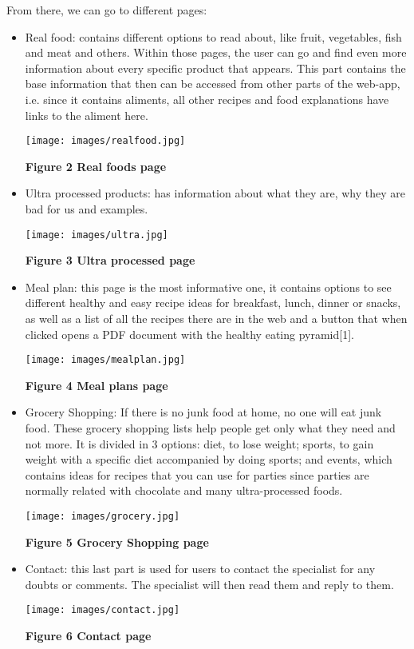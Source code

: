 \documentclass[10pt, a4paper]{article}
\begin{document}
    From there, we can go to different pages:
    \begin{itemize}
        \item Real food: contains different options to read about, like fruit, vegetables, fish and meat and others. Within those pages, the user can go and find even more information about every specific product that appears. This part contains the base information that then can be accessed from other parts of the web-app, i.e. since it contains aliments, all other recipes and food explanations have links to the aliment here.

        \texttt{[image: images/realfood.jpg]}

        \textbf{Figure 2 Real foods page}
        \vspace{2mm}

        \item Ultra processed products: has information about what they are, why they are bad for us and examples.

        \texttt{[image: images/ultra.jpg]}

        \textbf{Figure 3 Ultra processed page}
        \vspace{2mm}

        \item Meal plan: this page is the most informative one, it contains options to see different healthy and easy recipe ideas for breakfast, lunch, dinner or snacks, as well as a list of all the recipes there are in the web and a button that when clicked opens a PDF document with the healthy eating pyramid[1].

        \texttt{[image: images/mealplan.jpg]}

        \textbf{Figure 4 Meal plans page}
        \vspace{2mm}

        \item Grocery Shopping: If there is no junk food at home, no one will eat junk food. These grocery shopping lists help people get only what they need and not more. It is divided in 3 options: diet, to lose weight; sports, to gain weight with a specific diet accompanied by doing sports; and events, which contains ideas for recipes that you can use for parties since parties are normally related with chocolate and many ultra-processed foods.

        \texttt{[image: images/grocery.jpg]}

        \textbf{Figure 5 Grocery Shopping page}
        \vspace{2mm}

        \item Contact: this last part is used for users to contact the specialist for any doubts or comments. The specialist will then read them and reply to them.

        \texttt{[image: images/contact.jpg]}

        \textbf{Figure 6 Contact page}
        \vspace{2mm}

    \end{itemize}
\end{document}

